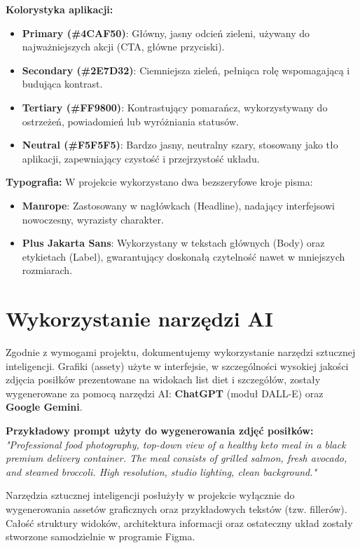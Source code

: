 \textbf{Kolorystyka aplikacji:}
\begin{itemize}
    \item \textbf{Primary (\#4CAF50)}: Główny, jasny odcień zieleni, używany do najważniejszych akcji (CTA, główne przyciski).
    \item \textbf{Secondary (\#2E7D32)}: Ciemniejsza zieleń, pełniąca rolę wspomagającą i budująca kontrast.
    \item \textbf{Tertiary (\#FF9800)}: Kontrastujący pomarańcz, wykorzystywany do ostrzeżeń, powiadomień lub wyróżniania statusów.
    \item \textbf{Neutral (\#F5F5F5)}: Bardzo jasny, neutralny szary, stosowany jako tło aplikacji, zapewniający czystość i przejrzystość układu.
\end{itemize}

\textbf{Typografia:}
W projekcie wykorzystano dwa bezszeryfowe kroje pisma:
\begin{itemize}
    \item \textbf{Manrope}: Zastosowany w nagłówkach (Headline), nadający interfejsowi nowoczesny, wyrazisty charakter.
    \item \textbf{Plus Jakarta Sans}: Wykorzystany w tekstach głównych (Body) oraz etykietach (Label), gwarantujący doskonałą czytelność nawet w mniejszych rozmiarach.
\end{itemize}

\section{Wykorzystanie narzędzi AI}
Zgodnie z wymogami projektu, dokumentujemy wykorzystanie narzędzi sztucznej inteligencji. Grafiki (assety) użyte w interfejsie, w szczególności wysokiej jakości zdjęcia posiłków prezentowane na widokach list diet i szczegółów, zostały wygenerowane za pomocą narzędzi AI: \textbf{ChatGPT} (moduł DALL-E) oraz \textbf{Google Gemini}.

\textbf{Przykładowy prompt użyty do wygenerowania zdjęć posiłków:} \\
\textit{"Professional food photography, top-down view of a healthy keto meal in a black premium delivery container. The meal consists of grilled salmon, fresh avocado, and steamed broccoli. High resolution, studio lighting, clean background."}

Narzędzia sztucznej inteligencji posłużyły w projekcie wyłącznie do wygenerowania assetów graficznych oraz przykładowych tekstów (tzw. fillerów). Całość struktury widoków, architektura informacji oraz ostateczny układ zostały stworzone samodzielnie w programie Figma.